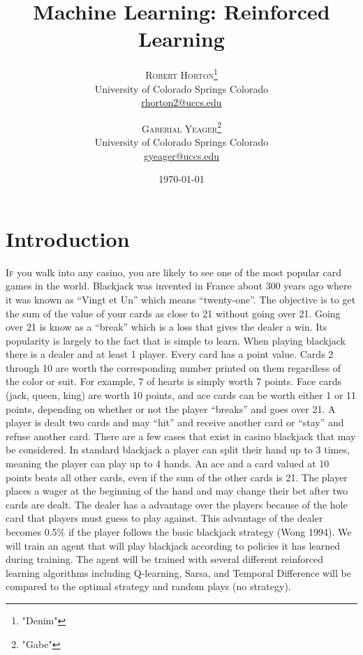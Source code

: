 \documentclass[twoside,twocolumn]{article}
\title{Machine Learning: Reinforced Learning} %
\author{%
\textsc{Robert Horton}\thanks{"Denim"} \\[1ex] %
\normalsize University of Colorado Springs Colorado \\ %
\normalsize \href{mailto:rhorton2@uccs.edu}{rhorton2@uccs.edu} %
\and %
\textsc{Gaberial Yeager}\thanks{"Gabe"} \\[1ex] %
\normalsize University of Colorado Springs Colorado \\ %
\normalsize \href{mailto:gyeager@uccs.edu}{gyeager@uccs.edu} %
}
\date{\today} %
\begin{document}
\maketitle


\section{Introduction}

 
\lettrine[nindent=0em,lines=3]{I}f you walk into any casino, you are likely to see one of the most popular card games in the world. Blackjack was invented in France about 300 years ago where it was known as “Vingt et Un” which means “twenty-one”. The objective is to get the sum of the value of your cards as close to 21 without going over 21. Going over 21 is know as a “break” which is a loss that gives the dealer a win. Its popularity is largely to the fact that is simple to learn. When playing blackjack there is a dealer and at least 1 player. Every card has a point value. Cards 2 through 10 are worth the corresponding number printed on them regardless of the color or suit. For example, 7 of hearts is simply worth 7 points. Face cards (jack, queen, king) are worth 10 points, and ace cards can be worth either 1 or 11 points, depending on whether or not the player “breaks” and goes over 21. A player is dealt two cards and may “hit” and receive another card or “stay” and refuse another card. There are a few cases that exist in casino blackjack that may be considered. In standard blackjack a player can split their hand up to 3 times, meaning the player can play up to 4 hands.  An ace and a card valued at 10 points beats all other cards, even if the sum of the other cards is 21. The player places a wager at the beginning of the hand and may change their bet after two cards are dealt. The dealer has a advantage over the players because of the hole card that players must guess to play against. This advantage of the dealer becomes 0.5\% if the player follows the basic blackjack strategy (Wong 1994). We will train an agent that will play blackjack according to policies it has learned during training. The agent will be trained with several different reinforced learning algorithms including Q-learning, Sarsa, and Temporal Difference will be compared to the optimal strategy and random plays (no strategy).
\end{document}
